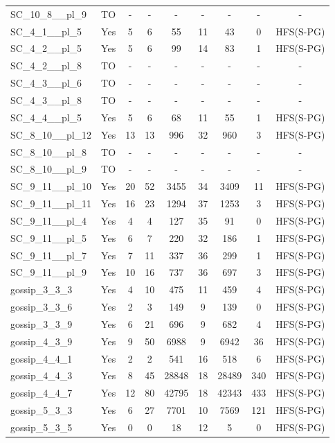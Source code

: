 \documentclass{article}
\begin{document}
\begin{tabular}{lcccccccc}
SC\_10\_8\_\_pl\_9 & TO & - & - & - & - & - & - & - \\
SC\_4\_1\_\_pl\_5 & Yes & 5 & 6 & 55 & 11 & 43 & 0 & HFS(S-PG) \\
SC\_4\_2\_\_pl\_5 & Yes & 5 & 6 & 99 & 14 & 83 & 1 & HFS(S-PG) \\
SC\_4\_2\_\_pl\_8 & TO & - & - & - & - & - & - & - \\
SC\_4\_3\_\_pl\_6 & TO & - & - & - & - & - & - & - \\
SC\_4\_3\_\_pl\_8 & TO & - & - & - & - & - & - & - \\
SC\_4\_4\_\_pl\_5 & Yes & 5 & 6 & 68 & 11 & 55 & 1 & HFS(S-PG) \\
SC\_8\_10\_\_pl\_12 & Yes & 13 & 13 & 996 & 32 & 960 & 3 & HFS(S-PG) \\
SC\_8\_10\_\_pl\_8 & TO & - & - & - & - & - & - & - \\
SC\_8\_10\_\_pl\_9 & TO & - & - & - & - & - & - & - \\
SC\_9\_11\_\_pl\_10 & Yes & 20 & 52 & 3455 & 34 & 3409 & 11 & HFS(S-PG) \\
SC\_9\_11\_\_pl\_11 & Yes & 16 & 23 & 1294 & 37 & 1253 & 3 & HFS(S-PG) \\
SC\_9\_11\_\_pl\_4 & Yes & 4 & 4 & 127 & 35 & 91 & 0 & HFS(S-PG) \\
SC\_9\_11\_\_pl\_5 & Yes & 6 & 7 & 220 & 32 & 186 & 1 & HFS(S-PG) \\
SC\_9\_11\_\_pl\_7 & Yes & 7 & 11 & 337 & 36 & 299 & 1 & HFS(S-PG) \\
SC\_9\_11\_\_pl\_9 & Yes & 10 & 16 & 737 & 36 & 697 & 3 & HFS(S-PG) \\
gossip\_3\_3\_3 & Yes & 4 & 10 & 475 & 11 & 459 & 4 & HFS(S-PG) \\
gossip\_3\_3\_6 & Yes & 2 & 3 & 149 & 9 & 139 & 0 & HFS(S-PG) \\
gossip\_3\_3\_9 & Yes & 6 & 21 & 696 & 9 & 682 & 4 & HFS(S-PG) \\
gossip\_4\_3\_9 & Yes & 9 & 50 & 6988 & 9 & 6942 & 36 & HFS(S-PG) \\
gossip\_4\_4\_1 & Yes & 2 & 2 & 541 & 16 & 518 & 6 & HFS(S-PG) \\
gossip\_4\_4\_3 & Yes & 8 & 45 & 28848 & 18 & 28489 & 340 & HFS(S-PG) \\
gossip\_4\_4\_7 & Yes & 12 & 80 & 42795 & 18 & 42343 & 433 & HFS(S-PG) \\
gossip\_5\_3\_3 & Yes & 6 & 27 & 7701 & 10 & 7569 & 121 & HFS(S-PG) \\
gossip\_5\_3\_5 & Yes & 0 & 0 & 18 & 12 & 5 & 0 & HFS(S-PG) \\

\end{tabular}
\end{document}
